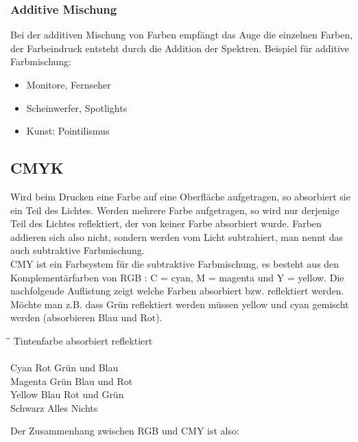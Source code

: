 \subsubsection{Additive Mischung}
Bei der additiven Mischung von Farben empfängt das Auge die einzelnen Farben, der Farbeindruck entsteht durch die Addition der Spektren. Beispiel für additive Farbmischung:
\begin{itemize}[leftmargin=1cm]
    \item Monitore, Fernseher
    \item Scheinwerfer, Spotlights
    \item Kunst: Pointilismus
\end{itemize}


\subsection{CMYK} 
Wird beim Drucken eine Farbe auf eine Oberfläche aufgetragen, so absorbiert sie ein Teil des Lichtes. Werden mehrere Farbe aufgetragen, so wird nur derjenige Teil des Lichtes reflektiert, der von keiner Farbe absorbiert wurde. Farben addieren sich also nicht, sondern werden vom Licht subtrahiert, man nennt das auch subtraktive Farbmischung.\\
CMY ist ein Farbsystem für die subtraktive Farbmischung, es besteht aus den Komplementärfarben von RGB : C = cyan, M = magenta und Y = yellow. Die nachfolgende Auflistung zeigt welche Farben absorbiert bzw. reflektiert werden. Möchte man z.B. dass Grün reflektiert werden müssen yellow und cyan gemischt werden (absorbieren Blau und Rot).

\begin{tabbing}
	\hspace{4cm}\=\hspace{4cm}\=\kill
	Tintenfarbe \> absorbiert \> reflektiert \\
	\> \> \\
	Cyan \> Rot \> Grün und Blau \\
	Magenta \> Grün \> Blau und Rot \\
	Yellow \> Blau \> Rot und Grün \\
	Schwarz \> Alles \> Nichts 
\end{tabbing} 

Der Zusammenhang zwischen RGB und CMY ist also:

